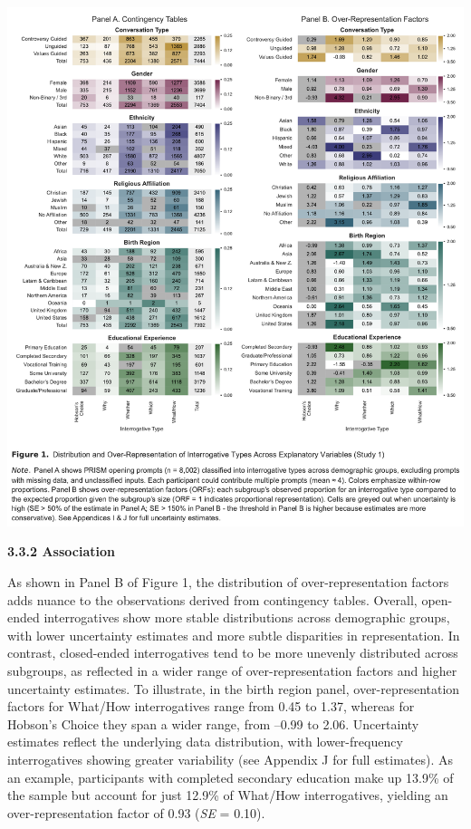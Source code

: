 \documentclass[
  12pt,
]{article}
\begin{document}
\begin{center}\includegraphics{../03_outputs/02_descriptive_analyses/figure_1} \end{center}

\textbf{3.3.2 Association}

As shown in Panel B of Figure 1, the distribution of over-representation factors adds nuance to the observations derived from contingency tables. Overall, open-ended interrogatives show more stable distributions across demographic groups, with lower uncertainty estimates and more subtle disparities in representation. In contrast, closed-ended interrogatives tend to be more unevenly distributed across subgroups, as reflected in a wider range of over-representation factors and higher uncertainty estimates. To illustrate, in the birth region panel, over-representation factors for What/How interrogatives range from 0.45 to 1.37, whereas for Hobson's Choice they span a wider range, from --0.99 to 2.06. Uncertainty estimates reflect the underlying data distribution, with lower-frequency interrogatives showing greater variability (see Appendix J for full estimates). As an example, participants with completed secondary education make up 13.9\% of the sample but account for just 12.9\% of What/How interrogatives, yielding an over-representation factor of 0.93 (\emph{SE} = 0.10).
\end{document}
